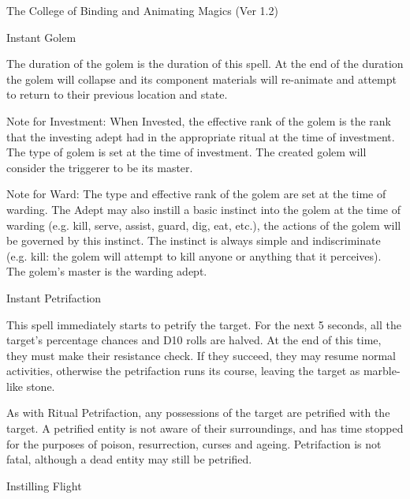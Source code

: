 \begin{Chapter}{The College of Binding and Animating Magics (Ver 1.2)}
\begin{spell}[S-4]{Instant Golem}
\begin{effects}
The duration of the golem is the duration of this spell.  At the end
of the duration the golem will collapse and its component materials
will re-animate and attempt to return to their previous location and
state.

Note for Investment: When Invested, the effective rank of the golem is
the rank that the investing adept had in the appropriate ritual at the
time of investment. The type of golem is set at the time of
investment.  The created golem will consider the triggerer to be its
master.

Note for Ward: The type and effective rank of the golem are set at the
time of warding.  The Adept may also instill a basic instinct into the
golem at the time of warding (e.g.  kill, serve, assist, guard, dig,
eat, etc.), the actions of the golem will be governed by this
instinct.  The instinct is always simple and indiscriminate
(e.g. kill: the golem will attempt to kill anyone or anything that it
perceives). The golem’s master is the warding adept.
\end{effects}
\end{spell}

\begin{spell}[S-5]{Instant Petrifaction}
\begin{effects}
This spell immediately starts to petrify the target.  For the next 5
seconds, all the target’s percentage chances and D10 rolls are halved.
At the end of this time, they must make their resistance check.  If
they succeed, they may resume normal activities, otherwise the
petrifaction runs its course, leaving the target as marble-like stone.

As with Ritual Petrifaction, any possessions of the target are
petrified with the target.  A petrified entity is not aware of their
surroundings, and has time stopped for the purposes of poison,
resurrection, curses and ageing.  Petrifaction is not fatal,
although a dead entity may still be petrified.
\end{effects}
\end{spell}

\begin{spell}[S-6]{Instilling Flight}


\end{spell}
\end{Chapter}

